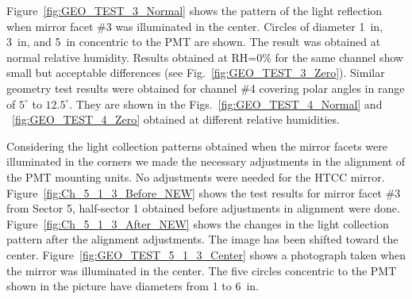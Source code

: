 
Figure~\ref{fig:GEO_TEST_3_Normal} shows the pattern of the light reflection when mirror facet \#3 was
illuminated in the center. Circles of diameter 1~in, 3~in, and 5~in concentric to the PMT are shown. The result was
obtained at normal relative humidity. Results obtained at RH=0\% for the same channel show small but acceptable
differences (see Fig.~\ref{fig:GEO_TEST_3_Zero}). Similar geometry test results were obtained for channel
\#4 covering polar angles in range of $5^\circ$ to $12.5^\circ$. They are shown in the
Figs.~\ref{fig:GEO_TEST_4_Normal} and ~\ref{fig:GEO_TEST_4_Zero} obtained at different relative humidities.

Considering the light collection patterns obtained when the mirror facets were illuminated in the corners we made
the necessary adjustments in the alignment of the PMT mounting units. No adjustments were needed for the HTCC
mirror. Figure~\ref{fig:Ch_5_1_3_Before_NEW} shows the test results for mirror facet \#3 from Sector 5,
half-sector 1 obtained before adjustments in alignment were done. Figure~\ref{fig:Ch_5_1_3_After_NEW} shows
the changes in the light collection pattern after the alignment adjustments. The image has been shifted toward the
center. Figure~\ref{fig:GEO_TEST_5_1_3_Center} shows a photograph taken when the mirror was illuminated in
the center. The five circles concentric to the PMT shown in the picture have diameters from 1 to 6~in. 

